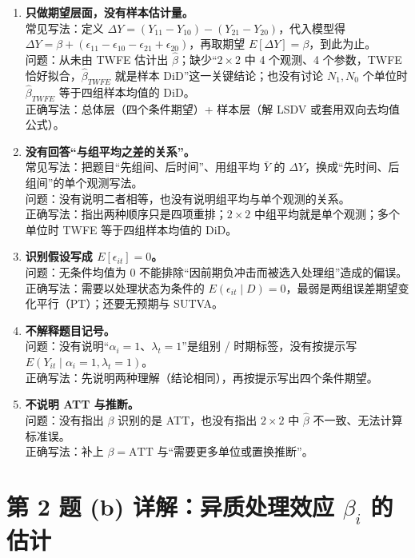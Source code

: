 \begin{note}[第 2(a) 题的常见错误]
\begin{enumerate}
  \item \textbf{只做期望层面，没有样本估计量。}\\
  常见写法：定义 $\Delta Y=(Y_{11}-Y_{10})-(Y_{21}-Y_{20})$，代入模型得 $\Delta Y=\beta+(\epsilon_{11}-\epsilon_{10}-\epsilon_{21}+\epsilon_{20})$，再取期望 $E[\Delta Y]=\beta$，到此为止。\\
  问题：从未由 TWFE 估计出 $\hat\beta$；缺少“$2\times2$ 中 4 个观测、4 个参数，TWFE 恰好拟合，$\hat\beta_{TWFE}$ 就是样本 DiD”这一关键结论；也没有讨论 $N_1,N_0$ 个单位时 $\hat\beta_{TWFE}$ 等于四组样本均值的 DiD。\\
  正确写法：总体层（四个条件期望）+ 样本层（解 LSDV 或套用双向去均值公式）。
  \item \textbf{没有回答“与组平均之差的关系”。}\\
  常见写法：把题目“先组间、后时间”、用组平均 $\bar Y$ 的 $\Delta Y$，换成“先时间、后组间”的单个观测写法。\\
  问题：没有说明二者相等，也没有说明组平均与单个观测的关系。\\
  正确写法：指出两种顺序只是四项重排；$2\times2$ 中组平均就是单个观测；多个单位时 TWFE 等于四组样本均值的 DiD。
  \item \textbf{识别假设写成 $E[\epsilon_{it}]=0$。}\\
  问题：无条件均值为 0 不能排除“因前期负冲击而被选入处理组”造成的偏误。\\
  正确写法：需要以处理状态为条件的 $E(\epsilon_{it}\mid D)=0$，最弱是两组误差期望变化平行（PT）；还要无预期与 SUTVA。
  \item \textbf{不解释题目记号。}\\
  问题：没有说明“$\alpha_i=1$、$\lambda_t=1$”是组别 / 时期标签，没有按提示写 $E(Y_{it}\mid\alpha_i=1,\lambda_t=1)$。\\
  正确写法：先说明两种理解（结论相同），再按提示写出四个条件期望。
  \item \textbf{不说明 ATT 与推断。}\\
  问题：没有指出 $\beta$ 识别的是 ATT，也没有指出 $2\times2$ 中 $\hat\beta$ 不一致、无法计算标准误。\\
  正确写法：补上 $\beta=\text{ATT}$ 与“需要更多单位或置换推断”。
\end{enumerate}
\end{note}

\section{第 2 题 (b) 详解：异质处理效应 \texorpdfstring{$\beta_i$}{beta\_i} 的估计}\label{sec:U17b-2b}

